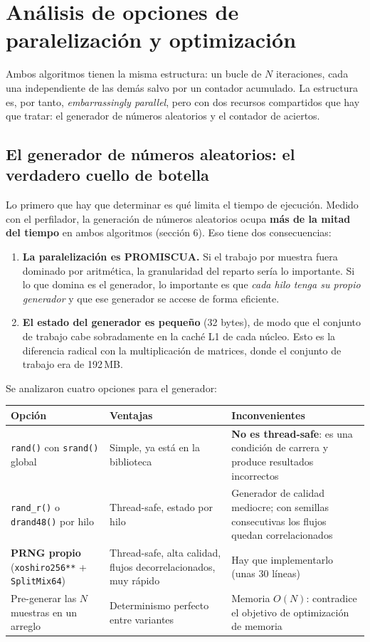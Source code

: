 \section{Análisis de opciones de paralelización y optimización}

Ambos algoritmos tienen la misma estructura: un bucle de $N$ iteraciones, cada una independiente de las demás salvo por un contador acumulado. La estructura es, por tanto, \emph{embarrassingly parallel}, pero con dos recursos compartidos que hay que tratar: el generador de números aleatorios y el contador de aciertos.

\subsection{El generador de números aleatorios: el verdadero cuello de botella}

Lo primero que hay que determinar es qué limita el tiempo de ejecución. Medido con el perfilador, la generación de números aleatorios ocupa \textbf{más de la mitad del tiempo} en ambos algoritmos (sección 6). Eso tiene dos consecuencias:

\begin{enumerate}
    \item \textbf{La paralelización es PROMISCUA.} Si el trabajo por muestra fuera dominado por aritmética, la granularidad del reparto sería lo importante. Si lo que domina es el generador, lo importante es que \emph{cada hilo tenga su propio generador} y que ese generador se accese de forma eficiente.
    \item \textbf{El estado del generador es pequeño} (32 bytes), de modo que el conjunto de trabajo cabe sobradamente en la caché L1 de cada núcleo. Esto es la diferencia radical con la multiplicación de matrices, donde el conjunto de trabajo era de 192\,MB.
\end{enumerate}

Se analizaron cuatro opciones para el generador:

\begin{center}
\begin{tabular}{|l|p{5.4cm}|p{5.4cm}|}
\hline
\textbf{Opción} & \textbf{Ventajas} & \textbf{Inconvenientes} \\
\hline
\texttt{rand()} con \texttt{srand()} global &
Simple, ya está en la biblioteca &
\textbf{No es thread-safe}: es una condición de carrera y produce resultados incorrectos \\
\hline
\texttt{rand\_r()} o \texttt{drand48()} por hilo &
Thread-safe, estado por hilo &
Generador de calidad mediocre; con semillas consecutivas los flujos quedan correlacionados \\
\hline
\textbf{PRNG propio} (\texttt{xoshiro256**} + \texttt{SplitMix64}) &
Thread-safe, alta calidad, flujos decorrelacionados, muy rápido &
Hay que implementarlo (unas 30 líneas) \\
\hline
Pre-generar las $N$ muestras en un arreglo &
Determinismo perfecto entre variantes &
Memoria $O(N)$: contradice el objetivo de optimización de memoria \\
\hline
\end{tabular}
\end{center}

